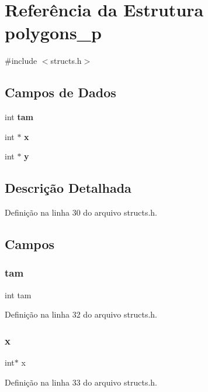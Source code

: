 \section{Referência da Estrutura polygons\+\_\+p}
\label{structpolygons__p}


{\ttfamily \#include $<$structs.\+h$>$}

\subsection*{Campos de Dados}
\begin{DoxyCompactItemize}
\item 
int \textbf{ tam}
\item 
int $\ast$ \textbf{ x}
\item 
int $\ast$ \textbf{ y}
\end{DoxyCompactItemize}


\subsection{Descrição Detalhada}


Definição na linha 30 do arquivo structs.\+h.



\subsection{Campos}
\mbox{\label{structpolygons__p_a76145a5161e42fad3d104769414503c6}} 
\subsubsection{tam}
{\footnotesize\ttfamily int tam}



Definição na linha 32 do arquivo structs.\+h.

\mbox{\label{structpolygons__p_ae522cb6f40eae74a9814a73b31d8ea7e}} 
\subsubsection{x}
{\footnotesize\ttfamily int$\ast$ x}



Definição na linha 33 do arquivo structs.\+h.

